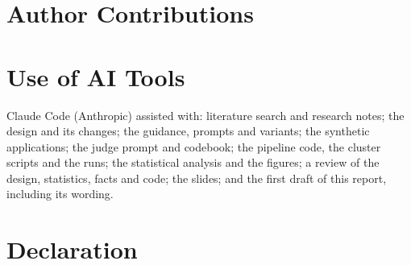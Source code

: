 \documentclass[11pt]{article}
\newif\ifshownotes
\newcommand{\teamnote}[2]{\ifshownotes\par\medskip\noindent{\small\color{blue}%
  \textbf{Notes: #1} (not report text)\par #2\par}\medskip\fi}
\begin{document}
\section*{Author Contributions}
\teamnote{author contributions}{%
One line per person with the CRediT roles (conceptualization, methodology, software, data
curation, formal analysis, investigation, visualization, writing -- original draft, writing --
review \& editing, project administration). Only the team can write this.}

\section*{Use of AI Tools}
Claude Code (Anthropic) assisted with: literature search and research notes; the design and its changes;
the guidance, prompts and variants; the synthetic applications; the judge prompt and codebook; the pipeline
code, the cluster scripts and the runs; the statistical analysis and the figures; a review of the design,
statistics, facts and code; the slides; and the first draft of this report, including its wording.
\teamnote{declare or rewrite}{%
Check that this list is complete. The draft text of this report was written by Claude Code on 2026-11-24:
rewrite it in your own words or declare it here. Also: run the hand check of the judge
(experiment/judge/README.md) and add its agreement to Methods; add the URL of the Estonian ministry page to
custom.bib (estonia2026schengen).}

\section*{Declaration}
\teamnote{declaration}{%
The course asks you to state that you wrote the whole report yourselves. Only the team can sign this, and
only after rewriting the draft text, or with an honest declaration of what was drafted by Claude Code.}



\appendix
\end{document}
